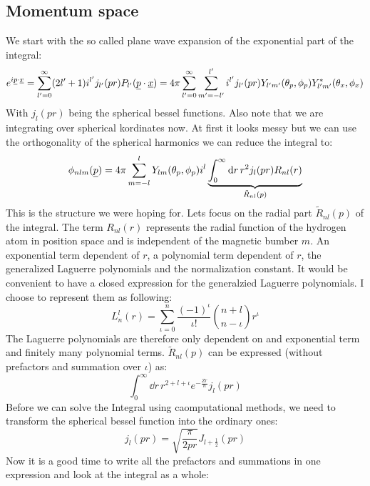 \subsection*{Momentum space}
We start with the so called plane wave expansion \cite{Jackson:1998nia} of the exponential part of the integral:
\begin{equation*}
    e^{i\underline{p}\cdot\underline{x}} = \sum_{l'=0}^\infty (2l'+1)i^{l'} j_{l'}(pr) P_{l'}(\underline{p}\cdot\underline{x}) = 4\pi\sum_{l'=0}^\infty \sum_{m'=-l'}^{l'} i^{l'} j_{l'}(pr) Y_{l'm'}(\theta_p, \phi_p) Y_{l'm'}^*(\theta_x, \phi_x)
\end{equation*}
With $j_l(pr)$ being the spherical bessel functions. Also note that we are integrating over spherical kordinates now. At first it looks messy but we can use the orthogonality of the spherical harmonics we can reduce the integral to:
\begin{equation*}
    \phi_{nlm}(\underline{p}) = 4\pi \sum_{m=-l}^{l}Y_{lm}(\theta_p,\phi_p)i^l\underbrace{\int_{0}^{\infty}\mathrm{d} r\,r^2j_l(pr)R_{nl}(r)}_{\tilde{R}_{nl}(p)}
\end{equation*}
This is the structure we were hoping for. Lets focus on the radial part $\tilde{R}_{nl}(p)$ of the integral.
The term $R_{nl}(r)$ represents the radial function of the hydrogen atom in position space and is independent of the magnetic bumber $m$. 
An exponential term dependent of $r$, a polynomial term dependent of $r$, the generalized Laguerre polynomials and the normalization constant. 
It would be convenient to have a closed expression for the generalzied Laguerre polynomials. 
I choose to represent them as following:
\begin{equation*}
    L_n^l(r) = \sum_{\iota=0}^{n} \frac{(-1)^{\iota}}{\iota!}\binom{n+l}{n-\iota}r^{\iota}
\end{equation*}
The Laguerre polynomials are therefore only dependent on and exponential term and finitely many polynomial terms. 
$\tilde{R}_{nl}(p)$ can be expressed (without prefactors and summation over $\iota$) as:
\begin{equation*}
    \int_{0}^{\infty}\dd r\,r^{2+l+\iota} e^{-\frac{Zr}{n}} j_l(pr)
\end{equation*}
Before we can solve the Integral using caomputational methods, we need to transform the spherical bessel function into the ordinary ones:
\begin{equation*}
    j_l(pr) = \sqrt{\frac{\pi}{2pr}}J_{l+\frac{1}{2}}(pr)
\end{equation*}
Now it is a good time to write all the prefactors and summations in one expression and look at the integral as a whole:
